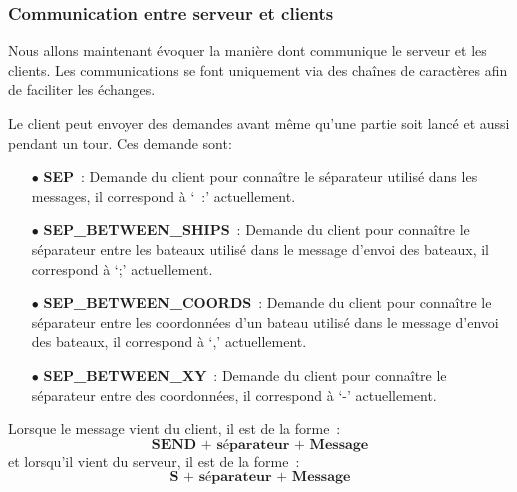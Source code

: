 \documentclass[12pt]{article}
\begin{document}
\bigskip

\subsubsection{Communication entre serveur et clients}
Nous allons maintenant évoquer la manière dont communique le serveur et les
clients. Les communications se font uniquement via des chaînes de caractères
afin de faciliter les échanges.

Le client peut envoyer des demandes avant même qu'une partie soit lancé et
aussi pendant un tour. Ces demande sont:

\begin{itemize}
      \item[$\bullet$] \textbf{SEP} : Demande du client pour connaître le
            séparateur
            utilisé dans les messages, il correspond à ` :' actuellement.
            \bigskip
      \item[$\bullet$] \textbf{SEP\_BETWEEN\_SHIPS} : Demande du client pour
            connaître le
            séparateur
            entre les bateaux utilisé dans le message d'envoi des bateaux, il
            correspond à `;' actuellement.
            \bigskip
      \item[$\bullet$] \textbf{SEP\_BETWEEN\_COORDS} : Demande du client pour
            connaître le
            séparateur
            entre les coordonnées d'un bateau utilisé dans le message d'envoi
            des bateaux, il
            correspond à `,' actuellement.
            \bigskip
      \item[$\bullet$] \textbf{SEP\_BETWEEN\_XY} : Demande du client pour
            connaître le séparateur entre des coordonnées, il correspond à `-'
            actuellement.
\end{itemize}

\bigskip

Lorsque le message vient du client, il est de la forme :
\[
      \textbf{SEND + séparateur + Message}
\]
et lorsqu'il vient du serveur, il est de la forme :
\[
      \textbf{S + séparateur + Message}
\]

\bigskip
\end{document}
